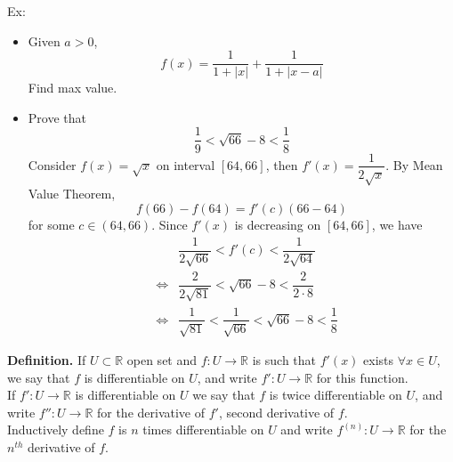 \documentclass[10pt,letterpaper]{article}
\begin{document}
	Ex:
	\begin{itemize}
		\item Given $a > 0$,
		$$f(x) = \dfrac{1}{1 + |x|} + \dfrac{1}{1 + |x - a|}$$
		Find max value.

		\item Prove that
		$$\dfrac{1}{9} < \sqrt{66} - 8 < \dfrac{1}{8}$$
		Consider $f(x) = \sqrt{x}$ on interval $[64, 66]$, then $f'(x) = \dfrac{1}{2\sqrt{x}}$.
		By Mean Value Theorem, 
		$$f(66) - f(64) = f'(c)(66 - 64)$$
		for some $c \in (64, 66)$.		
		Since $f'(x)$ is decreasing on $[64, 66]$, we have		
		\begin{eqnarray*}
			& & \dfrac{1}{2\sqrt{66}} < f'(c) < \dfrac{1}{2\sqrt{64}} \\
			& \Leftrightarrow & \dfrac{2}{2\sqrt{81}} < \sqrt{66} - 8 < \dfrac{2}{2\cdot 8} \\
			& \Leftrightarrow & \dfrac{1}{\sqrt{81}} < \dfrac{1}{\sqrt{66}} < \sqrt{66} - 8 < \dfrac{1}{8}
		\end{eqnarray*}				
	\end{itemize}

	\textbf{Definition. } If $U \subset \mathbb{R}$ open set and $f: U \rightarrow \mathbb{R}$ is 
	such that $f'(x)$ exists $\forall x \in U$, we say that $f$ is differentiable on $U$, 
	and write $f': U \rightarrow \mathbb{R}$ for this function.  \\
	If $f': U \rightarrow \mathbb{R}$ is differentiable on $U$ we say that $f$ is twice differentiable
	on $U$, and write $f'': U \rightarrow \mathbb{R}$ for the derivative of $f'$, second derivative of
	$f$. \\
	Inductively define $f$ is $n$ times differentiable on $U$ and write $f^{(n)}: U \rightarrow \mathbb{R}$
	for the $n^{th}$ derivative of $f$.  \\
	
\end{document}
